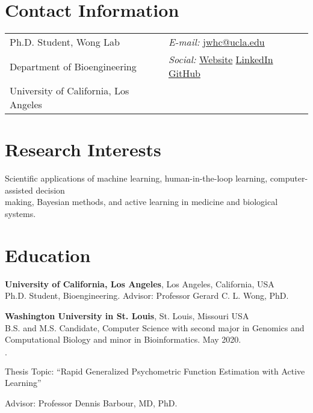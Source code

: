 \documentclass[line,margin]{res}
\newenvironment{list2}{
  \begin{list}{\boldmath$\cdot$}{%
      \setlength{\itemsep}{0in}
      \setlength{\parsep}{0in} \setlength{\parskip}{0in}
      \setlength{\topsep}{0in} \setlength{\partopsep}{0in}
      \setlength{\leftmargin}{0.2in}}}{\end{list}}
\begin{document}
\vspace*{-0.5in}

\begin{resume}
\section{\sc Contact Information}
\vspace{.05in}
\begin{tabularx}{\textwidth}{@{} X @{} X @{}}
Ph.D. Student, Wong Lab & {\it E-mail:} \href{mailto:jwhc@ucla.edu}{jwhc@ucla.edu} \\
Department of Bioengineering & {\it Social:}
\href{https://jowch.github.io}{Website}
\href{https://www.linkedin.com/in/jonathan-chen-54648478/}{LinkedIn}
\href{https://github.com/jowch}{GitHub} \\
University of California, Los Angeles
\end{tabularx}


\section{\sc Research Interests}
Scientific applications of machine learning, human-in-the-loop learning,
computer-assisted decision \\ making, Bayesian methods, and
active learning in medicine and biological systems.


\section{\sc Education}
{\bf University of California, Los Angeles}, Los Angeles, California, USA \vspace{0.3em} \\
Ph.D. Student, Bioengineering. Advisor: Professor Gerard C. L. Wong, PhD.

{\bf Washington University in St. Louis}, St. Louis, Missouri USA \vspace{0.3em} \\
B.S. and M.S. Candidate, Computer Science with second major in Genomics
and Computational Biology and minor in Bioinformatics. May 2020.
\vspace*{0.3em}
\begin{list2}
\vspace*{.05in}
\item Thesis Topic: ``Rapid Generalized Psychometric Function Estimation
with Active Learning''
\item Advisor: Professor Dennis Barbour, MD, PhD.
\end{list2}



\end{resume}
\end{document}
